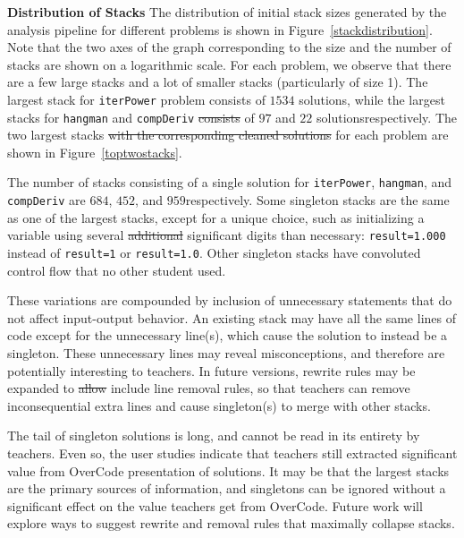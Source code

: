 \documentclass[12pt,twoside]{mitthesis}
\newcommand \codevar[1]{\texttt{#1}}
\providecommand{\DIFaddtex}[1]{{\protect\color{blue}\uwave{#1}}} %
\providecommand{\DIFdeltex}[1]{{\protect\color{red}\sout{#1}}}                      %
\providecommand{\DIFaddbegin}{} %
\providecommand{\DIFaddend}{} %
\providecommand{\DIFdelbegin}{} %
\providecommand{\DIFdelend}{} %
\providecommand{\DIFadd}[1]{\texorpdfstring{\DIFaddtex{#1}}{#1}} %
\providecommand{\DIFdel}[1]{\texorpdfstring{\DIFdeltex{#1}}{}} %
\begin{document}
{\bf Distribution of Stacks} The distribution of initial stack sizes generated by the analysis pipeline for different problems is shown in Figure~\ref{stackdistribution}. Note that the two axes of the graph corresponding to the size and the number of stacks are shown on a logarithmic scale. For each problem, we observe that there are a few large stacks and a lot of smaller stacks (particularly of size 1). The largest stack for \codevar{iterPower} problem consists of $1534$ solutions, while the largest stacks for \codevar{hangman} and \codevar{compDeriv} \DIFdelbegin \DIFdel{consists }\DIFdelend \DIFaddbegin \DIFadd{consist }\DIFaddend of $97$ and $22$ solutions\DIFaddbegin \DIFadd{, }\DIFaddend respectively. The two largest stacks \DIFdelbegin \DIFdel{with the corresponding cleaned solutions }\DIFdelend for each problem are shown in Figure~\ref{toptwostacks}. 

The number of stacks consisting of a single solution for \codevar{iterPower}, \codevar{hangman}, and \codevar{compDeriv} are $684$, $452$, and $959$\DIFaddbegin \DIFadd{, }\DIFaddend respectively. Some singleton stacks are the same as one of the largest stacks, except for a unique choice, such as initializing a variable using several \DIFdelbegin \DIFdel{additional }\DIFdelend \DIFaddbegin \DIFadd{more }\DIFaddend significant digits than necessary: \codevar{result=1.000} instead of \codevar{result=1} or \codevar{result=1.0}. Other singleton stacks have convoluted control flow that no other student used. 

These variations are compounded by inclusion of unnecessary statements that do not affect input-output behavior. An existing stack may have all the same lines of code except for the unnecessary line(s), which cause the solution to instead be a singleton. These unnecessary lines may reveal misconceptions, and therefore are potentially interesting to teachers. In future versions, rewrite rules may be expanded to \DIFdelbegin \DIFdel{allow }\DIFdelend include line removal rules, so that teachers can remove inconsequential extra lines and cause singleton(s) to merge with other stacks. 

The tail of singleton solutions is long, and cannot be read in its entirety by teachers. Even so, the user studies indicate that teachers still extracted significant value from OverCode presentation of solutions. It may be that the largest stacks are the primary sources of information, and singletons can be ignored without a significant effect on the value teachers get from OverCode. Future work will explore ways to suggest rewrite and removal rules that maximally collapse stacks.
\end{document}
